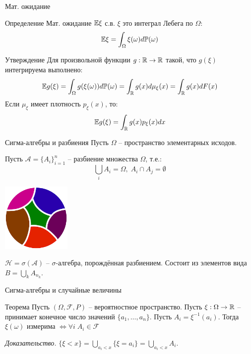 \documentclass{beamer}
\begin{document}
\begin{frame}{Мат. ожидание} 
    \begin{block}{Определение}
    Мат. ожидание $\mathbb{E} \xi$ с.в. $\xi$ это интеграл Лебега по $\Omega$:
        $$
            \mathbb{E} \xi = \int_{\Omega}\xi(\omega)d\mathbb{P}(\omega)
        $$
    \end{block}
    \begin{block}{Утверждение}
        Для произвольной функции $g : \mathbb{R} \to \mathbb{R}$ такой, что $g(\xi)$ интегрируема выполнено:
        $$
            \mathbb{E} g(\xi) = \int_{\Omega} g(\xi(\omega))d\mathbb{P}(\omega)=\int_{\mathbb{R}} g(x) d\mu_{\xi}(x) = 
            \int_{\mathbb{R}} g(x) dF(x)
        $$
        Если $\mu_{\xi}$ имеет плотность $p_{\xi}(x)$, то:
        $$
            \mathbb{E} g(\xi) = \int_{\mathbb{R}} g(x) p_{\xi}(x) dx
        $$
    \end{block}
\end{frame}

\begin{frame}{Сигма-алгебры и разбиения}
    Пусть $\Omega$ -- пространство элементарных исходов.
    
    Пусть $\mathcal{A} = \{A_i\}_{i=1}^n$ -- разбиение множества $\Omega$, т.е.:
    $$\bigcup_i A_i = \Omega, \; A_i \cap A_j = \emptyset$$

    \begin{center}
        \includegraphics[width=0.25\textwidth]{8_figs/разбиение.png}
    \end{center}

    $\mathcal{H} = \sigma(\mathcal{A})$ -- $\sigma$-алгебра, порождённая разбиением. Состоит из элементов вида 
    $B = \bigcup_{k} A_{n_k}$.
\end{frame}

\begin{frame}{Сигма-алгебры и случайные величины}
    \begin{block}{Теорема}
        Пусть $(\Omega, \mathcal{F} , P)$ -- вероятностное пространство. Пусть $\xi: \Omega \to \mathbb{R}$ -- принимает конечное число значений $\{a_1, \ldots, a_n\}$.
        Пусть $A_i = \xi^{-1}(a_i)$. Тогда $\xi(\omega)$ измерима $\Longleftrightarrow \forall i \; A_i \in \mathcal{F}$
    \end{block}
    \textit{Доказательство.}
    $\{ \xi < x \} = \bigcup\limits_{a_i < x} \{ \xi = a_i\} = \bigcup\limits_{a_i < x} A_i$.
\end{frame}
\end{document}
